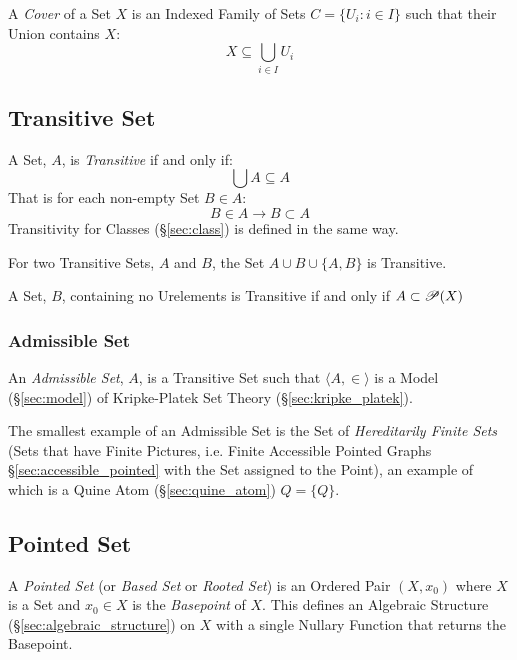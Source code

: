 A \emph{Cover} of a Set $X$ is an Indexed Family of Sets $C = \{ U_i :
i \in I \}$ such that their Union contains $X$:
\[
  X \subseteq \bigcup_{i \in I} U_i
\]



\subsection{Transitive Set}\label{sec:transitive_set}

A Set, $A$, is \emph{Transitive} if and only if:
\[
  \bigcup A \subseteq A
\]
That is for each non-empty Set $B \in A$:
\[
  B \in A \rightarrow B \subset A
\]
Transitivity for Classes (\S\ref{sec:class}) is defined in the same
way.

For two Transitive Sets, $A$ and $B$, the Set $A \cup B \cup \{A,B\}$
is Transitive.

A Set, $B$, containing no Urelements is Transitive if and only if $A
\subset \mathscr{P}(X)$



\subsubsection{Admissible Set}\label{sec:admissible_set}

An \emph{Admissible Set}, $A$, is a Transitive Set such that $\langle A, \in
\rangle$ is a Model (\S\ref{sec:model}) of Kripke-Platek Set Theory
(\S\ref{sec:kripke_platek}).

The smallest example of an Admissible Set is the Set of \emph{Hereditarily
  Finite Sets} (Sets that have Finite Pictures, i.e. Finite Accessible Pointed
Graphs \S\ref{sec:accessible_pointed} with the Set assigned to the Point), an
example of which is a Quine Atom (\S\ref{sec:quine_atom}) $Q = \{Q\}$.
\cite{aczel88} %



\subsection{Pointed Set}\label{sec:pointed_set}

A \emph{Pointed Set} (or \emph{Based Set} or \emph{Rooted Set}) is an Ordered
Pair $(X, x_0)$ where $X$ is a Set and $x_0 \in X$ is the \emph{Basepoint} of
$X$. This defines an Algebraic Structure (\S\ref{sec:algebraic_structure}) on
$X$ with a single Nullary Function that returns the Basepoint.




